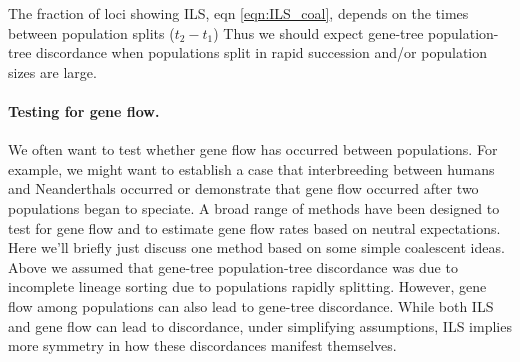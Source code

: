 The fraction of loci showing ILS, eqn \eqref{eqn:ILS_coal}, depends on the times between
population splits ($t_2-t_1$) Thus we should expect gene-tree population-tree discordance when populations split in rapid succession and/or population sizes are large.



\paragraph{Testing for gene flow.}

We often want to test whether gene flow has occurred between populations. For example, we might want to establish a case
that interbreeding between humans and Neanderthals occurred or demonstrate that
gene flow occurred after two populations began to speciate.
A broad range of methods have been designed to test for gene flow and
to estimate gene flow rates based on neutral expectations. Here we'll briefly just discuss one method based on
some simple coalescent ideas.  Above we assumed that gene-tree population-tree discordance was due to
incomplete lineage sorting due to populations rapidly
splitting. However, gene flow among populations can also lead to gene-tree discordance.
While both ILS and gene flow can lead to discordance, under
simplifying assumptions, ILS implies more symmetry in how these
discordances manifest themselves.\\



